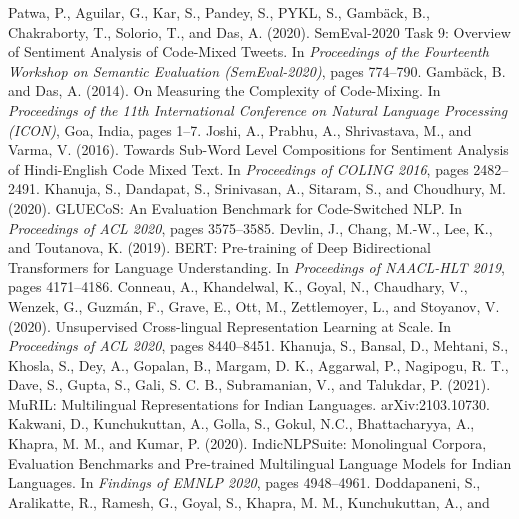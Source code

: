 \documentclass{nle}
\begin{document}
\begin{thebibliography}{}
 Patwa, P., Aguilar, G., Kar, S., Pandey, S., PYKL, S., Gamb\"ack, B., Chakraborty, T., Solorio, T.,
and Das, A. (2020). SemEval-2020 Task 9: Overview of Sentiment Analysis of Code-Mixed Tweets. In \emph{Proceedings of
the Fourteenth Workshop on Semantic Evaluation (SemEval-2020)}, pages 774--790.
 Gamb\"ack, B. and Das, A. (2014). On Measuring the Complexity of Code-Mixing. In
\emph{Proceedings of the 11th International Conference on Natural Language Processing (ICON)}, Goa, India, pages 1--7.
 Joshi, A., Prabhu, A., Shrivastava, M., and Varma, V. (2016). Towards Sub-Word Level Compositions for
Sentiment Analysis of Hindi-English Code Mixed Text. In \emph{Proceedings of COLING 2016}, pages 2482--2491.
 Khanuja, S., Dandapat, S., Srinivasan, A., Sitaram, S., and Choudhury, M. (2020). GLUECoS: An
Evaluation Benchmark for Code-Switched NLP. In \emph{Proceedings of ACL 2020}, pages 3575--3585.
 Devlin, J., Chang, M.-W., Lee, K., and Toutanova, K. (2019). BERT: Pre-training of Deep Bidirectional
Transformers for Language Understanding. In \emph{Proceedings of NAACL-HLT 2019}, pages 4171--4186.
 Conneau, A., Khandelwal, K., Goyal, N., Chaudhary, V., Wenzek, G., Guzm\'an, F., Grave, E., Ott, M.,
Zettlemoyer, L., and Stoyanov, V. (2020). Unsupervised Cross-lingual Representation Learning at Scale. In
\emph{Proceedings of ACL 2020}, pages 8440--8451.
 Khanuja, S., Bansal, D., Mehtani, S., Khosla, S., Dey, A., Gopalan, B., Margam, D. K., Aggarwal, P.,
Nagipogu, R. T., Dave, S., Gupta, S., Gali, S. C. B., Subramanian, V., and Talukdar, P. (2021). MuRIL: Multilingual
Representations for Indian Languages. arXiv:2103.10730.
 Kakwani, D., Kunchukuttan, A., Golla, S., Gokul, N.C., Bhattacharyya, A., Khapra, M. M., and
Kumar, P. (2020). IndicNLPSuite: Monolingual Corpora, Evaluation Benchmarks and Pre-trained Multilingual Language Models
for Indian Languages. In \emph{Findings of EMNLP 2020}, pages 4948--4961.
 Doddapaneni, S., Aralikatte, R., Ramesh, G., Goyal, S., Khapra, M. M., Kunchukuttan, A., and

\end{thebibliography}
\end{document}
